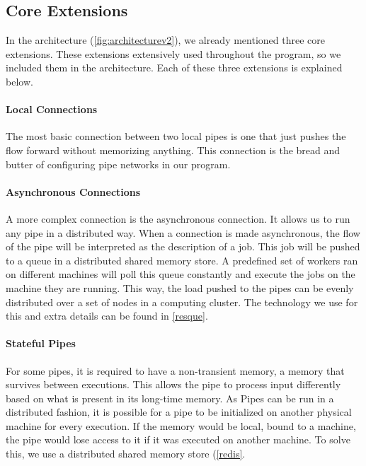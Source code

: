 \subsection{Core Extensions}

In the architecture (\autoref{fig:architecturev2}), we already mentioned three core extensions. These extensions extensively used throughout the program, so we included them in the architecture. Each of these three extensions is explained below.

\paragraph{Local Connections}

The most basic connection between two local pipes is one that just pushes the flow forward without memorizing anything. This connection is the bread and butter of configuring pipe networks in our program.

\paragraph{Asynchronous Connections}

A more complex connection is the asynchronous connection. It allows us to run any pipe in a distributed way. When a connection is made asynchronous, the flow of the pipe will be interpreted as the description of a job. This job will be pushed to a queue in a distributed shared memory store. A predefined set of workers ran on different machines will poll this queue constantly and execute the jobs on the machine they are running. This way, the load pushed to the pipes can be evenly distributed over a set of nodes in a computing cluster. The technology we use for this and extra details can be found in \autoref{resque}.

\paragraph{Stateful Pipes}

For some pipes, it is required to have a non-transient memory, a memory that survives between executions. This allows the pipe to process input differently based on what is present in its long-time memory. As Pipes can be run in a distributed fashion, it is possible for a pipe to be initialized on another physical machine for every execution. If the memory would be local, bound to a machine, the pipe would lose access to it if it was executed on another machine. To solve this, we use a distributed shared memory store (\autoref{redis}.

